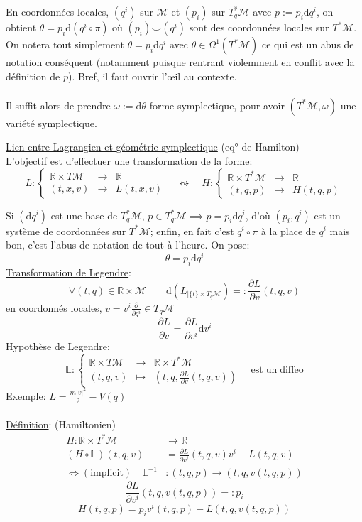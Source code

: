\documentclass[a4paper,11pt]{article}
\renewcommand{\d}{{\mathrm{d}}}
\newcommand{\dr}[2]{\frac{\partial {#1}}{\partial{#2}}}
\begin{document}
En coordonnées locales, $(q^i)$ sur $\mathcal{M}$ et $(p_i)$ sur $T_q^*\mathcal{M}$ avec $p := p_i \d q^i$, on obtient $\theta = p_i \d \left(q^i\circ \pi\right)$ où $(p_i)\!\!\smile\!\!(q^i)$ sont des coordonnées locales sur $T^*\mathcal{M}$. On notera tout simplement $\theta = p_i\d q^i$ avec $\theta \in \Omega^1(T^*\mathcal{M})$
ce qui est un abus de notation conséquent (notamment puisque rentrant violemment en conflit avec la définition de $p$). Bref, il faut ouvrir l'œil au contexte.\\
\\
Il suffit alors de prendre $\omega := \d \theta$ forme symplectique, pour avoir $(T^*\mathcal{M},\omega)$ une variété symplectique.

\noindent \underline{Lien entre Lagrangien et géométrie symplectique} (eq° de Hamilton)\\
L'objectif est d'effectuer une transformation de la forme:
\begin{equation*}
L: \left\{ \begin{matrix}
\mathbb{R}\times T \mathcal{M} & \to & \mathbb{R}\\
(t,x,v) & \to & L(t,x,v)
\end{matrix}\right.
\quad \leftrightsquigarrow \quad H:\left\{\begin{matrix}
\mathbb{R}\times T^* \mathcal{M} & \to & \mathbb{R}\\
(t,q,p) & \to & H(t,q,p)
\end{matrix}\right.
\end{equation*}

Si $(\d q^i)$ est une base de $T_q^*\mathcal{M}$, $p\in T^*_q\mathcal{M} \implies p=p_i\d q^i$, d'où $(p_i, q^i)$ est un système de coordonnées sur $T^*\mathcal{M}$; enfin, en fait c'est $q^i\circ \pi$ à la place de $q^i$ mais bon, c'est l'abus de notation de tout à l'heure. On pose:
$$\theta = p_i\d q^i$$
\underline{Transformation de Legendre}:
$$\forall (t,q) \in \mathbb{R}\times\mathcal{M}\quad\quad \d \left(L_{|\{t\}\times T_q\mathcal{M}}\right) =: \dr{L}{v}(t,q,v)$$
en coordonnés locales, $v=v^i\frac{\partial}{\partial q^i} \in T_q\mathcal{M}$
$$\dr{L}{v} = \dr{L}{v^i} \d v^i$$
Hypothèse de Legendre: 
\begin{equation*}
\mathbb{L}: \left\{\begin{matrix}
\mathbb{R}\times T\mathcal{M} & \to & \mathbb{R}\times T^*\mathcal{M}\\
(t,q,v) & \mapsto & (t,q, \dr{L}{v}(t,q,v))
\end{matrix}\right. \quad \mathrm{est}\; \mathrm{un}\; \mathrm{diffeo}
\end{equation*}
Exemple: $L = \frac{m |v|^2}{2} - V(q)$\\
\\
\underline{Définition}: (Hamiltonien)
\begin{align*}
H : \mathbb{R}\times T^*\mathcal{M} &\to \mathbb{R}\\
(H\circ\mathbb{L})(t,q,v) &= \dr{L}{v^i}(t,q,v) v^i - L(t,q,v)\\
\iff (\mathrm{implicit})\quad  \mathbb{L}^{-1}&: (t,q,p)\to (t,q,v(t,q,p))
\end{align*}
$$\dr{L}{v^i}(t,q,v(t,q,p)) =: p_i $$
$$H(t,q,p) = p_i v^i(t,q,p) - L(t,q,v(t,q,p))$$
\end{document}
